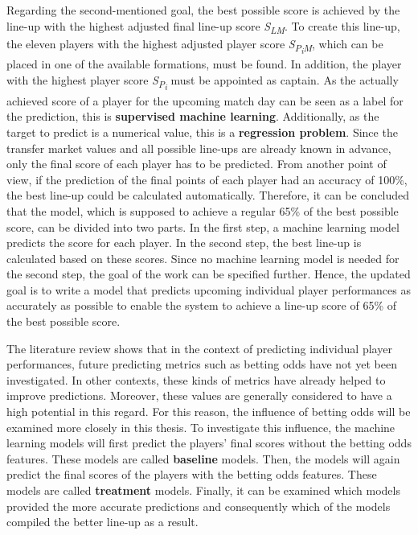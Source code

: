Regarding the second-mentioned goal, the best possible score is achieved by the line-up with the highest adjusted final line-up score \emph{S\textsubscript{LM}}. To create this line-up, the eleven players with the highest adjusted player score \emph{S\textsubscript{P\textsubscript{i}M}}, which can be placed in one of the available formations, must be found. In addition, the player with the highest player score \emph{S\textsubscript{P\textsubscript{i}}} must be appointed as captain. As the actually achieved score of a player for the upcoming match day can be seen as a label for the prediction, this is \textbf{supervised machine learning}. Additionally, as the target to predict is a numerical value, this is a \textbf{regression problem}. Since the transfer market values and all possible line-ups are already known in advance, only the final score of each player has to be predicted. From another point of view, if the prediction of the final points of each player had an accuracy of 100\%, the best line-up could be calculated automatically. Therefore, it can be concluded that the model, which is supposed to achieve a regular 65\% of the best possible score, can be divided into two parts. In the first step, a machine learning model predicts the score for each player. In the second step, the best line-up is calculated based on these scores. Since no machine learning model is needed for the second step, the goal of the work can be specified further. Hence, the updated goal is to write a model that predicts upcoming individual player performances as accurately as possible to enable the system to achieve a line-up score of 65\% of the best possible score.

The literature review shows that in the context of predicting individual player performances, future predicting metrics such as betting odds have not yet been investigated. In other contexts, these kinds of metrics have already helped to improve predictions. \parencite[cf.][]{landers_machine_2017} Moreover, these values are generally considered to have a high potential in this regard. \parencite[cf.][]{wheatcroft_profiting_2020,goldstein_wisdom_2014} For this reason, the influence of betting odds will be examined more closely in this thesis. To investigate this influence, the machine learning models will first predict the players' final scores without the betting odds features. These models are called \textbf{baseline} models. Then, the models will again predict the final scores of the players with the betting odds features. These models are called \textbf{treatment} models. Finally, it can be examined which models provided the more accurate predictions and consequently which of the models compiled the better line-up as a result.

